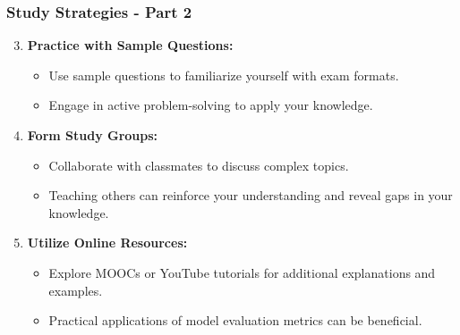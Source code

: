 \documentclass[aspectratio=169]{beamer}
\begin{document}
\begin{frame}[fragile]
    \frametitle{Study Strategies - Part 2}
    \begin{enumerate}
        \setcounter{enumi}{2}
        \item \textbf{Practice with Sample Questions:}
            \begin{itemize}
                \item Use sample questions to familiarize yourself with exam formats.
                \item Engage in active problem-solving to apply your knowledge.
            \end{itemize}

        \item \textbf{Form Study Groups:}
            \begin{itemize}
                \item Collaborate with classmates to discuss complex topics.
                \item Teaching others can reinforce your understanding and reveal gaps in your knowledge.
            \end{itemize}

        \item \textbf{Utilize Online Resources:}
            \begin{itemize}
                \item Explore MOOCs or YouTube tutorials for additional explanations and examples.
                \item Practical applications of model evaluation metrics can be beneficial.
            \end{itemize}
    \end{enumerate}
\end{frame}
\end{document}
